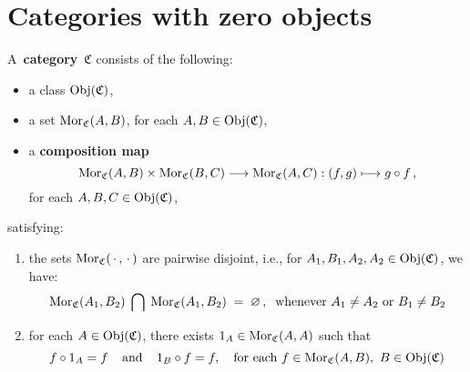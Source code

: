 

\section{Categories with zero objects}
\setcounter{theorem}{0}
\setcounter{equation}{0}


\renewcommand{\theenumi}{\roman{enumi}}
\renewcommand{\labelenumi}{\textnormal{(\theenumi)}$\;\;$}


\begin{definition}[Category]
\mbox{}
\vskip 0.15cm
\noindent
A \,\textbf{category}\, $\mathfrak{C}$ consists of the following:
\begin{itemize}
\item
	a class $\textnormal{Obj}(\mathfrak{C})$,
\item
	a set $\textnormal{Mor}_{\mathfrak{C}}(A,B)$, for each $A, B \in \textnormal{Obj}(\mathfrak{C})$,
\item
	a \textbf{composition map}
	\begin{equation*}
	\textnormal{Mor}_{\mathfrak{C}}(A,B) \times \textnormal{Mor}_{\mathfrak{C}}(B,C) \longrightarrow \textnormal{Mor}_{\mathfrak{C}}(A,C) : (f,g) \longmapsto g \circ f\,,
	\end{equation*}
	for each $A, B, C \in \textnormal{Obj}(\mathfrak{C})$,
\end{itemize}
satisfying:
\begin{enumerate}
\item
	the sets $\textnormal{Mor}_{\mathfrak{C}}(\,\cdot\,,\,\cdot\,)$ are pairwise disjoint, i.e.,
	for $A_{1}, B_{1}, A_{2}, A_{2} \in \textnormal{Obj}(\mathfrak{C})$, we have:
	\begin{equation*}
	\textnormal{Mor}_{\mathfrak{C}}(A_{1},B_{2})\;\bigcap\;\textnormal{Mor}_{\mathfrak{C}}(A_{1},B_{2})
	\; = \;
		\varnothing\,,
	\;\;
	\textnormal{whenever $A_{1} \neq A_{2}$ or $B_{1} \neq B_{2}$}
	\end{equation*}
\item
	for each $A \in \textnormal{Obj}(\mathfrak{C})$, there exists $1_{A} \in \textnormal{Mor}_{\mathfrak{C}}(A,A)$ such that
	\begin{equation*}
	f \circ 1_{A} = f
	\;\;\;\;\textnormal{and}\;\;\;\;
	1_{B} \circ f = f,
	\quad
	\textnormal{for each $f \in \textnormal{Mor}_{\mathfrak{C}}(A,B)$, \,$B \in \textnormal{Obj}(\mathfrak{C})$}
	\end{equation*}

\end{enumerate}
\end{definition}
